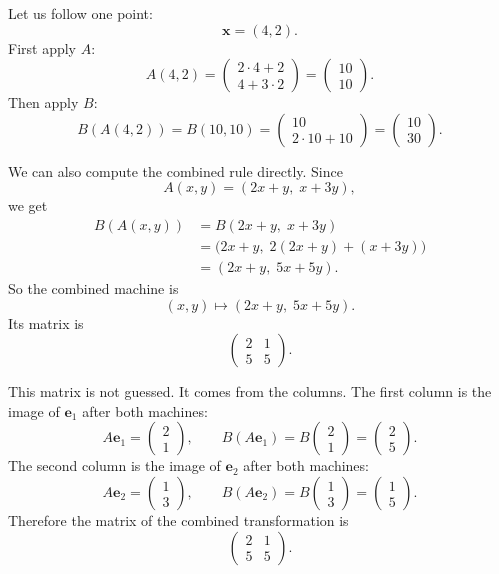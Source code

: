 Let us follow one point:
\[
    \mathbf x=(4,2).
\]
First apply \(A\):
\[
    A(4,2)
    =
    \begin{pmatrix}
        2\cdot4+2\\
        4+3\cdot2
    \end{pmatrix}
    =
    \begin{pmatrix}
        10\\
        10
    \end{pmatrix}.
\]
Then apply \(B\):
\[
    B(A(4,2))
    =
    B(10,10)
    =
    \begin{pmatrix}
        10\\
        2\cdot10+10
    \end{pmatrix}
    =
    \begin{pmatrix}
        10\\
        30
    \end{pmatrix}.
\]

We can also compute the combined rule directly.  Since
\[
    A(x,y)=(2x+y,\;x+3y),
\]
we get
\[
\begin{aligned}
    B(A(x,y))
    &=
    B(2x+y,\;x+3y)\\
    &=
    \bigl(2x+y,\;2(2x+y)+(x+3y)\bigr)\\
    &=
    (2x+y,\;5x+5y).
\end{aligned}
\]
So the combined machine is
\[
    (x,y)\longmapsto (2x+y,\;5x+5y).
\]
Its matrix is
\[
    \begin{pmatrix}
        2&1\\
        5&5
    \end{pmatrix}.
\]

This matrix is not guessed.  It comes from the columns.  The first column is the image
of \(\mathbf e_1\) after both machines:
\[
    A\mathbf e_1=
    \begin{pmatrix}2\\1\end{pmatrix},
    \qquad
    B(A\mathbf e_1)=
    B\begin{pmatrix}2\\1\end{pmatrix}
    =
    \begin{pmatrix}2\\5\end{pmatrix}.
\]
The second column is the image of \(\mathbf e_2\) after both machines:
\[
    A\mathbf e_2=
    \begin{pmatrix}1\\3\end{pmatrix},
    \qquad
    B(A\mathbf e_2)=
    B\begin{pmatrix}1\\3\end{pmatrix}
    =
    \begin{pmatrix}1\\5\end{pmatrix}.
\]
Therefore the matrix of the combined transformation is
\[
    \begin{pmatrix}
        2&1\\
        5&5
    \end{pmatrix}.
\]

